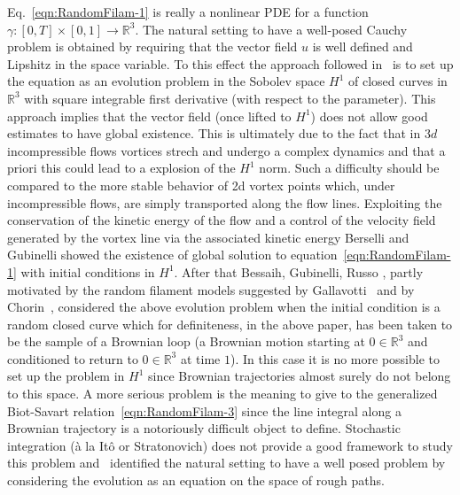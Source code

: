 \documentclass[11pt,a4paper,leqno]{amsart}%
\theoremstyle{plain}
\theoremstyle{remark}
\theoremstyle{plain}
\numberwithin{equation}{section}
\begin{document}
Eq.~\eqref{eqn:RandomFilam-1} is really a nonlinear PDE for a function $\gamma: [0,T]\times[0,1]\to \mathbb{R}^3$. The natural setting to have a well-posed Cauchy problem is obtained by requiring that the vector field $u$ is well defined and Lipshitz in the space variable. 
To this effect the approach followed in~\cite{[Bers+Bess_2002]} is to set up the equation as an evolution problem in the Sobolev space $H^1$ of closed curves in $\mathbb{R}^3$ with square integrable first derivative (with respect to the parameter). This approach implies that the vector field (once lifted to $H^1$) does not allow good estimates to have global existence. 
This is ultimately due to the fact that in $3d$ incompressible flows vortices strech and undergo a complex dynamics and that a priori this could lead to a explosion of the $H^1$ norm. 
Such a difficulty should be compared to the more stable behavior of 2d vortex points which, under incompressible flows, are simply transported along the flow lines. 
Exploiting the conservation of the kinetic energy of the flow and a control of the velocity field generated by the vortex line via the associated kinetic energy Berselli and  Gubinelli \cite{[Bers+Gub_2007]}  showed the existence of global solution to  equation~\eqref{eqn:RandomFilam-1} with initial conditions in $H^1$.
After that Bessaih, Gubinelli, Russo \cite{[Bess+Gub_2005]}, partly motivated by the random filament models suggested by Gallavotti~\cite{Gallavotti} and by Chorin~\cite{Chorin}, considered the above evolution problem when the initial condition is a random closed curve which for definiteness, in the above paper, has been taken to be the sample of a Brownian loop (a Brownian motion starting at $0\in\mathbb{R}^3$ and conditioned to return to $0\in\mathbb{R}^3$ at time $1$).
In this case it is no more possible to set up the problem in $H^1$ since Brownian trajectories almost surely do not belong to this space. A more serious problem is the meaning to give to the generalized Biot-Savart relation~\eqref{eqn:RandomFilam-3} since the line integral along a Brownian trajectory is a notoriously difficult object to define. Stochastic integration (\`a la It\^o or Stratonovich) does not provide a good framework to study this problem and~\cite{[Bess+Gub_2005]} identified the natural setting to have a well posed problem by considering the evolution as an equation on the space of rough paths. 
\end{document}
